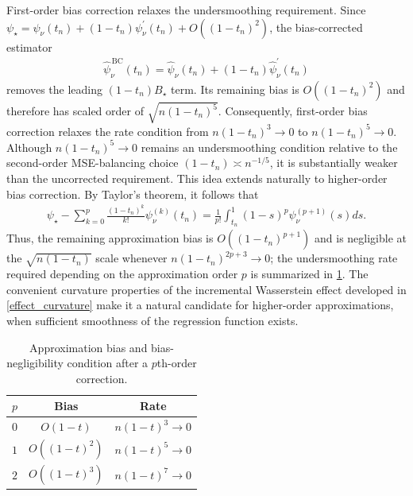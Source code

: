 \documentclass[11pt,twoside]{article}
\theoremstyle{definition}
\theoremstyle{remark}
\begin{document}
First-order bias correction relaxes the undersmoothing requirement. Since $\psi_\star = \psi_\nu(t_n) + (1-t_n)\psi^{\prime}_\nu(t_n) + O((1-t_n)^2)$, the bias-corrected estimator
\begin{align*}
    \widehat{\psi}_\nu^{\,\mathrm{BC}}(t_n) = \widehat{\psi}_\nu(t_n) + (1-t_n)\widehat{\psi}^{\prime}_\nu(t_n)
\end{align*}
removes the leading $(1 - t_n) B_\star$ term. Its remaining bias is $O((1-t_n)^2)$ and therefore has scaled order of $\sqrt{n(1 - t_n)^5}$. Consequently, first-order bias correction relaxes the rate condition  from $n(1 - t_n)^3\to0$ to $n(1 - t_n)^5 \to 0$. Although $n(1- t_n)^5 \to 0$ remains an undersmoothing condition relative to the second-order MSE-balancing choice $(1-t_n)\asymp n^{-1/5}$, it is substantially weaker than the uncorrected requirement. This idea extends naturally to higher-order bias correction. By Taylor's theorem, it follows that
\begin{align*}
    \psi_\star - \sum_{k=0}^{p} \frac{(1 - t_n)^k}{k!}\psi_\nu^{(k)}(t_n) = \frac{1}{p!} \int_{t_n}^{1} (1-s)^p\psi_\nu^{(p+1)}(s)ds.
\end{align*}
Thus, the remaining approximation bias is $O((1-t_n)^{p+1})$ and is negligible at the $\sqrt{n(1-t_n)}$ scale whenever $n(1 - t_n)^{2p+3}\to0$; the undersmoothing rate required depending on the approximation order $p$ is summarized in \cref{table_of_rates}. The convenient curvature properties of the incremental Wasserstein effect developed in \cref{effect_curvature} make it a natural candidate for higher-order approximations, when sufficient smoothness of the regression function exists. 
\begin{table}[h]
\centering
\begin{tabular}{l|cc}
$p$ & Bias & Rate \\ \hline \hline
$0$ & $O(1-t)$ &  $n(1-t)^3 \to 0$  \\
$1$ & $O((1-t)^2)$ & $n(1-t)^5 \to 0$  \\
$2$ & $O((1-t)^3)$ &  $n(1-t)^7 \to 0$
\end{tabular}
\caption{Approximation bias and bias-negligibility condition after a $p$th-order correction.}
\label{table_of_rates}
\end{table}
\end{document}
